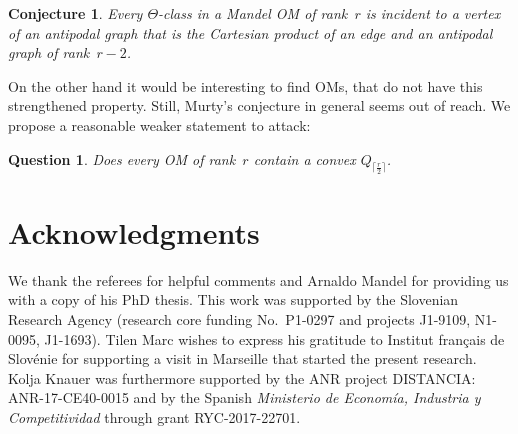 \documentclass[final,11pt]{article}
\newtheorem{quest}{Question}
\newtheorem{conj}{Conjecture}%
\begin{document}
\begin{conj}
Every $\Theta$-class in a Mandel OM of rank~$r$ is incident to a vertex of an antipodal graph that is the Cartesian product of an edge and an antipodal graph of rank~$r-2$.
\end{conj}

On the other hand it would be interesting to find OMs, that do not have this strengthened property. Still, Murty's conjecture in general seems out of reach. We propose a reasonable weaker statement to attack:

\begin{quest}\label{conj:cube}
 Does every OM of rank~$r$ contain a convex $Q_{\lceil\frac{r}{2}\rceil}$.
\end{quest}

\section{Acknowledgments}
We thank the referees for helpful comments and Arnaldo Mandel for providing us with a copy of his PhD thesis.
This work was supported by the Slovenian Research Agency (research core funding
No.\ P1-0297 and projects J1-9109, N1-0095, J1-1693). Tilen Marc wishes to express his gratitude to Institut français de Slovénie for supporting a visit in Marseille that started the present research. Kolja Knauer was furthermore supported by the ANR project DISTANCIA: ANR-17-CE40-0015 and by the Spanish \emph{Ministerio de Econom\'ia,
Industria y Competitividad} through grant RYC-2017-22701.

{\footnotesize }
\end{document}
